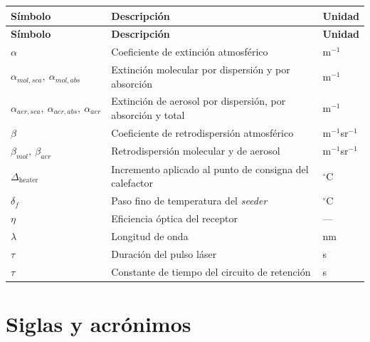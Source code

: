 \begin{longtable}{@{}p{}p{}p{}@{}}
\toprule
\textbf{Símbolo} & \textbf{Descripción} & \textbf{Unidad} \\
\midrule
\endfirsthead
\toprule
\textbf{Símbolo} & \textbf{Descripción} & \textbf{Unidad} \\
\midrule
\endhead
\bottomrule
\endlastfoot
$\alpha$ & Coeficiente de extinción atmosférico & m$^{-1}$ \\
$\alpha_{mol,sca},\ \alpha_{mol,abs}$ & Extinción molecular por dispersión y por absorción & m$^{-1}$ \\
$\alpha_{aer,sca},\ \alpha_{aer,abs},\ \alpha_{aer}$ & Extinción de aerosol por dispersión, por absorción y total & m$^{-1}$ \\
$\beta$ & Coeficiente de retrodispersión atmosférico & m$^{-1}$sr$^{-1}$ \\
$\beta_{mol},\ \beta_{aer}$ & Retrodispersión molecular y de aerosol & m$^{-1}$sr$^{-1}$ \\
$\Delta_{\mathrm{heater}}$ & Incremento aplicado al punto de consigna del calefactor & $^{\circ}$C \\
$\delta_f$ & Paso fino de temperatura del \emph{seeder} & $^{\circ}$C \\
$\eta$ & Eficiencia óptica del receptor & --- \\
$\lambda$ & Longitud de onda & nm \\
$\tau$ & Duración del pulso láser & s \\
$\tau$ & Constante de tiempo del circuito de retención & s \\
\end{longtable}

\section*{Siglas y acrónimos}

